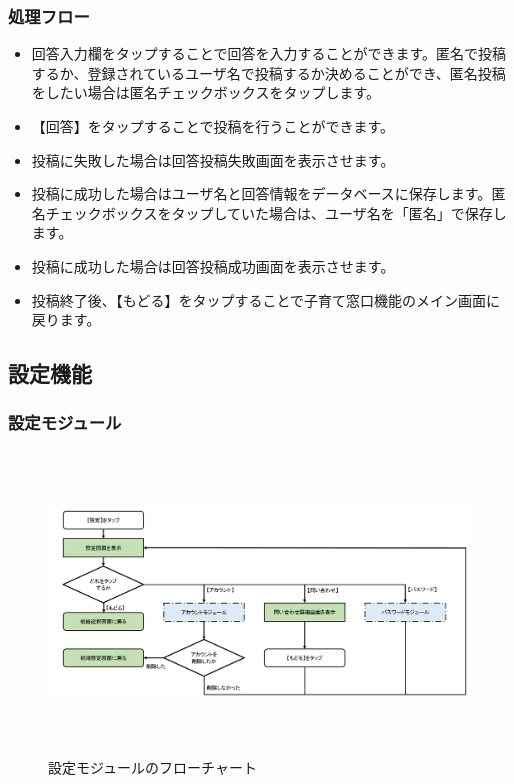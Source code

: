 \documentclass[a4j]{jarticle}
\begin{document}
\subsubsection*{処理フロー}
\begin{itemize}
\item 回答入力欄をタップすることで回答を入力することができます。匿名で投稿するか、登録されているユーザ名で投稿するか決めることができ、匿名投稿をしたい場合は匿名チェックボックスをタップします。
\item 【回答】をタップすることで投稿を行うことができます。
\item 投稿に失敗した場合は回答投稿失敗画面を表示させます。
\item 投稿に成功した場合はユーザ名と回答情報をデータベースに保存します。匿名チェックボックスをタップしていた場合は、ユーザ名を「匿名」で保存します。
\item 投稿に成功した場合は回答投稿成功画面を表示させます。
\item 投稿終了後、【もどる】をタップすることで子育て窓口機能のメイン画面に戻ります。

\end{itemize}

\newpage

\subsection{設定機能}
\subsubsection{設定モジュール\label{設定}} %
\begin{figure}[H]
    \begin{center}
      \includegraphics[height=8.0cm] {設定_全体.png} %
    \caption {設定モジュールのフローチャート}
    \label{設定_全体}
    \end{center}
\end{figure}
\end{document}
